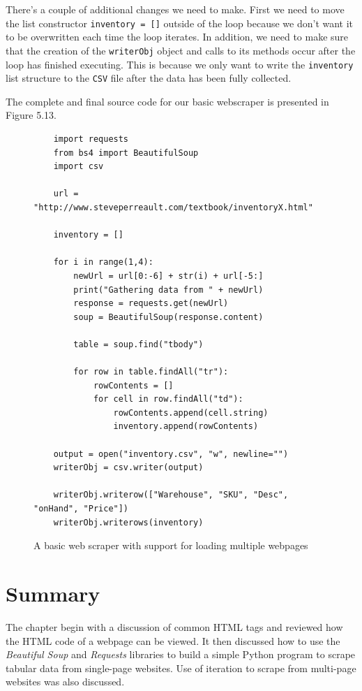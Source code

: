 \documentclass{book}
\begin{document}
There's a couple of additional changes we need to make. First we need to move the list constructor \texttt{inventory = []} outside of the loop because we don't want it to be overwritten each time the loop iterates. In addition, we need to make sure that the creation of the \texttt{writerObj} object and calls to its methods occur after the loop has finished executing. This is because we only want to write the \texttt{inventory} list structure to the \texttt{CSV} file after the data has been fully collected. 

The complete and final source code for our basic webscraper is presented in Figure 5.13.

\begin{figure}[h]
	\caption{A basic web scraper with support for loading multiple webpages}
	\begin{lstlisting}
	import requests
	from bs4 import BeautifulSoup
	import csv
	
	url = "http://www.steveperreault.com/textbook/inventoryX.html"
	
	inventory = []
	
	for i in range(1,4):
		newUrl = url[0:-6] + str(i) + url[-5:]
		print("Gathering data from " + newUrl)
		response = requests.get(newUrl)
		soup = BeautifulSoup(response.content)
	
		table = soup.find("tbody")
	
		for row in table.findAll("tr"):
			rowContents = []
			for cell in row.findAll("td"):
				rowContents.append(cell.string)
				inventory.append(rowContents)
	
	output = open("inventory.csv", "w", newline="")
	writerObj = csv.writer(output)
	
	writerObj.writerow(["Warehouse", "SKU", "Desc", "onHand", "Price"])
	writerObj.writerows(inventory)
	\end{lstlisting}
	
\end{figure}

\section{Summary}
The chapter begin with a discussion of common HTML tags and reviewed how the HTML code of a webpage can be viewed. It then discussed how to use the \textit{Beautiful Soup} and \textit{Requests} libraries to build a simple Python program to scrape tabular data from single-page websites. Use of iteration to scrape from multi-page websites was also discussed.
\end{document}
